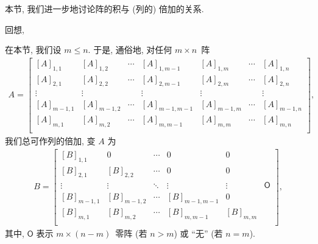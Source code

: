 \documentclass[../libro.tex]{subfiles}
\begin{document}
本节, 我们进一步地讨论阵的积与 (列的) 倍加的关系.

回想,

\TheoremMultipljad*

在本节, 我们设 \(m \leq n\).
于是, 通俗地, 对任何 \(m \times n\)~阵
\begin{align*}
    A =
    \begin{bmatrix}
        [A]_{1,1}   & [A]_{1,2}   & \cdots & [A]_{1,m-1}   & [A]_{1,m}   & \cdots & [A]_{1,n}   \\
        [A]_{2,1}   & [A]_{2,2}   & \cdots & [A]_{2,m-1}   & [A]_{2,m}   & \cdots & [A]_{2,n}   \\
        \vdots      & \vdots      & {}     & \vdots        & \vdots      & {}     & \vdots      \\
        [A]_{m-1,1} & [A]_{m-1,2} & \cdots & [A]_{m-1,m-1} & [A]_{m-1,m} & \cdots & [A]_{m-1,n} \\
        [A]_{m,1}   & [A]_{m,2}   & \cdots & [A]_{m,m-1}   & [A]_{m,m}   & \cdots & [A]_{m,n}   \\
    \end{bmatrix},
\end{align*}
我们总可作列的倍加, 变 \(A\) 为
\begin{align*}
    B =
    \begin{bmatrix}
        [B]_{1,1}   & 0           & \cdots & 0             & 0         & {}         \\
        [B]_{2,1}   & [B]_{2,2}   & \cdots & 0             & 0         & {}         \\
        \vdots      & \vdots      & \ddots & \vdots        & \vdots    & \mathsf{O} \\
        [B]_{m-1,1} & [B]_{m-1,2} & \cdots & [B]_{m-1,m-1} & 0         & {}         \\
        [B]_{m,1}   & [B]_{m,2}   & \cdots & [B]_{m,m-1}   & [B]_{m,m} & {}         \\
    \end{bmatrix},
\end{align*}
其中, \(\mathsf{O}\) 表示 \(m \times (n - m)\)~零阵
(若 \(n > m\))
或 ``无'' (若 \(n = m\)).
\end{document}
